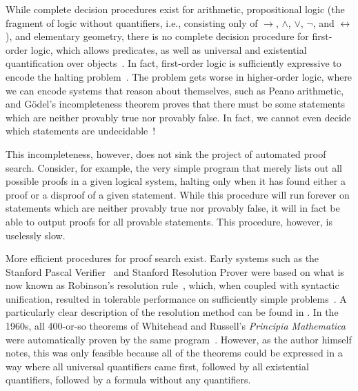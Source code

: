 While complete decision procedures exist for arithmetic, propositional logic (the fragment of logic without quantifiers, i.e., consisting only of $\to$, $\wedge$, $\vee$, $\neg$, and $\leftrightarrow$), and elementary geometry, there is no complete decision procedure for first-order logic, which allows predicates, as well as universal and existential quantification over objects~\cite{davis2001early}.
In fact, first-order logic is sufficiently expressive to encode the halting problem~\cite{Church1936,Turing1937}.
The problem gets worse in higher-order logic, where we can encode systems that reason about themselves, such as Peano arithmetic, and Gödel's incompleteness theorem proves that there must be some statements which are neither provably true nor provably false.
In fact, we cannot even decide which statements are undecidable~\cite{Are2011Makholm}!

This incompleteness, however, does not sink the project of automated proof search.
Consider, for example, the very simple program that merely lists out all possible proofs in a given logical system, halting only when it has found either a proof or a disproof of a given statement.
While this procedure will run forever on statements which are neither provably true nor provably false, it will in fact be able to output proofs for all provable statements.
This procedure, however, is uselessly slow.

More efficient procedures for proof search exist.
Early systems such as the Stanford Pascal Verifier~\cite{luckham1979stanford} and Stanford Resolution Prover were based on what is now known as Robinson's resolution rule~\cite{Machine1965Robinson}, which, when coupled with syntactic unification, resulted in tolerable performance on sufficiently simple problems~\cite{davis2001early,Brief2019Darbari}.
A particularly clear description of the resolution method can be found in \textcite[pp.~17--18]{Metamathematics1994Shankar}.
In the 1960s, all 400-or-so theorems of Whitehead and Russell's \emph{Principia Mathematica} were automatically proven by the same program~\cite[p.~9]{davis2001early}.
However, as the author himself notes, this was only feasible because all of the theorems could be expressed in a way where all universal quantifiers came first, followed by all existential quantifiers, followed by a formula without any quantifiers.

